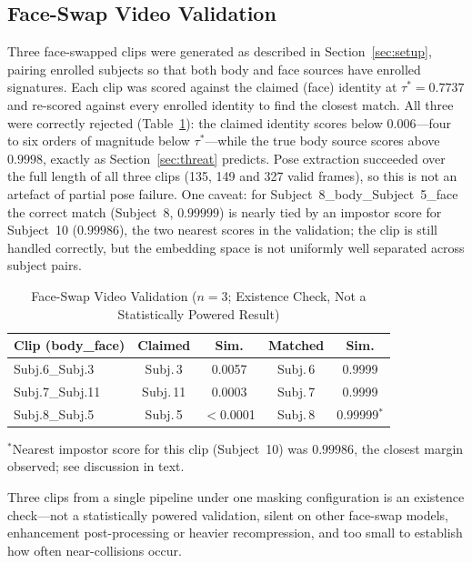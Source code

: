 \documentclass[conference]{IEEEtran}
\newcommand{\tabhead}[1]{\textbf{#1}}
\begin{document}
\subsection{Face-Swap Video Validation}
\label{sec:deepfake-results}

Three face-swapped clips were generated as described in
Section~\ref{sec:setup}, pairing enrolled subjects so that both body and face
sources have enrolled signatures. Each clip was scored against the claimed
(face) identity at $\tau^* = 0.7737$ and re-scored against every enrolled
identity to find the closest match. All three were correctly rejected
(Table~\ref{tab:deepfake-video}): the claimed identity scores below
$0.006$---four to six orders of magnitude below $\tau^*$---while the true body
source scores above $0.9998$, exactly as Section~\ref{sec:threat} predicts. Pose
extraction succeeded over the full length of all three clips (135, 149 and 327
valid frames), so this is not an artefact of partial pose failure. One caveat:
for Subject~8\_body\_Subject~5\_face the correct match (Subject~8, $0.99999$) is
nearly tied by an impostor score for Subject~10 ($0.99986$), the two nearest
scores in the validation; the clip is still handled correctly, but the
embedding space is not uniformly well separated across subject pairs.

\begin{table}[!tb]
\caption{Face-Swap Video Validation ($n=3$; Existence Check, Not a
Statistically Powered Result)}
\label{tab:deepfake-video}
\centering
\small
\begin{tabular}{@{}lcccc@{}}
\toprule
\tabhead{Clip (body\_face)} & \tabhead{Claimed} & \tabhead{Sim.} &
\tabhead{Matched} & \tabhead{Sim.} \\
\midrule
Subj.6\_Subj.3 & Subj.\,3 & 0.0057 & Subj.\,6 & 0.9999 \\
Subj.7\_Subj.11 & Subj.\,11 & 0.0003 & Subj.\,7 & 0.9999 \\
Subj.8\_Subj.5  & Subj.\,5 & $<$0.0001 & Subj.\,8 & 0.99999$^{\ast}$ \\
\bottomrule
\end{tabular}

\vspace{2pt}
\raggedright\footnotesize
$^{\ast}$Nearest impostor score for this clip (Subject~10) was $0.99986$,
the closest margin observed; see discussion in text.
\end{table}

Three clips from a single pipeline under one masking configuration is an
existence check---not a statistically powered validation, silent on other
face-swap models, enhancement post-processing or heavier recompression, and
too small to establish how often near-collisions occur.
\end{document}
